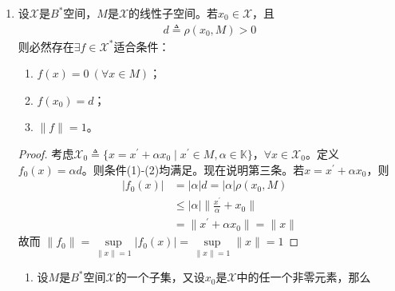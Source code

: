 \begin{enumerate}[leftmargin=2cm, label=\arabic*]
\begin{enumerate}[leftmargin=1cm, label=(\arabic*)]
\begin{proof}
            在一般的$B^*$空间中，$\rho(x_0, M) =\inf\limits_{y\in M} \|x_0-y\|$。事实上，$\forall n\in N$以及 $\forall x_0\in \mathscr{X}$，按下确界定义，$\exists x_n\in M$，使得
            \begin{align*}
                \rho(x_0, M) \leqslant \rho(x_0, x_n) \leqslant \rho(x_0, M) + \frac{1}{n}
            \end{align*}
            因此
            \begin{align*}
                |f(x_0)| &= |f(x_n-x_0)| \leqslant \|f\| \|x_n-x_0\| \\
                &\leqslant  \|f\| \left( \rho(x_0, M) + \frac{1}{n}\right)
            \end{align*}
            令$n\to\infty$即得到结果。
        \end{proof}
    \end{enumerate}
    \item 设$\mathscr{X}$是$B^*$空间，$M$是$\mathscr{X}$的线性子空间。若$x_0\in\mathscr{X}$，且
    \begin{align*}
        d \triangleq \rho(x_0, M) > 0
    \end{align*}
    则必然存在$\exists f\in\mathscr{X}^*$适合条件：
    \begin{enumerate}[leftmargin=1cm, label=(\arabic*)]
        \item $f(x) = 0\ (\forall x\in M)$；
        \item $f(x_0) = d$；
        \item $\|f\| = 1$。
    \end{enumerate}
    \begin{proof}
        考虑$\mathscr{X}_0 \triangleq\{x = x^{\prime}+\alpha x_0\mid x^{\prime}\in M, \alpha\in\mathbb{K} \}$，$\forall x\in\mathscr{X}_0$。定义$f_0(x) = \alpha d$。则条件(1)-(2)均满足。现在说明第三条。若$x = x^{\prime} + \alpha x_0$，则
        \begin{align*}
            |f_0(x)| &= |\alpha| d = |\alpha|\rho(x_0, M) \\
            & \leqslant |\alpha| \| \frac{x^{\prime}}{\alpha} + x_0 \| \\
            & = \|x^{\prime} + \alpha x_0\| = \|x\|
        \end{align*}
        故而 $\|f_0\| = \sup\limits_{\|x\| = 1} |f_0(x)| = \sup\limits_{\|x\| = 1}\|x\| = 1$
    \end{proof}
    \begin{enumerate}[leftmargin=1cm, label=(\arabic*)]
        \item 设$M$是$B^*$空间$\mathscr{X}$的一个子集，又设$x_0$是$\mathscr{X}$中的任一个非零元素，那么

\end{enumerate}
\end{enumerate}
